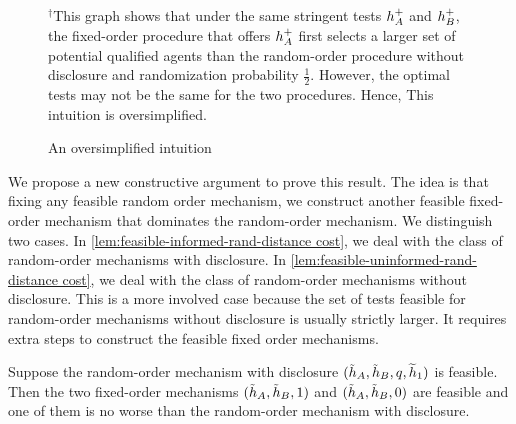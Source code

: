 \begin{figure}
\caption{An oversimplified intuition}
\label{fig: oversimplified intuition}
  \rule{0in}{1.2em}$^\dag$\scriptsize  This graph shows that under the same stringent tests $h_A^+$ and $h_B^+$, the fixed-order procedure that offers $h_A^+$ first selects a larger set of potential qualified agents than the random-order procedure without disclosure and randomization probability $\frac12$.
  However, the optimal tests may not be the same for the two procedures. Hence, This intuition is oversimplified.
\end{figure}


We propose a new constructive argument to prove this result.
The idea is that fixing any feasible random order mechanism, we construct another feasible fixed-order mechanism that dominates the random-order mechanism.
We distinguish two cases.
In \cref{lem:feasible-informed-rand-distance cost}, we deal with the class of random-order mechanisms with disclosure.
In \cref{lem:feasible-uninformed-rand-distance cost}, we deal with the class of random-order mechanisms without disclosure.
This is a more involved case because the set of tests feasible for random-order mechanisms without disclosure is usually strictly larger.
It requires extra steps to construct the feasible fixed order mechanisms.



\begin{lemma}\label{lem:feasible-informed-rand-distance cost}
 Suppose the  random-order mechanism  with disclosure $(\tilde{h}_A,\tilde{h}_B,q,\widetilde h_1)$ is feasible. 
 Then the two fixed-order mechanisms $(\tilde{h}_A,\tilde{h}_B,1)$ and $(\tilde{h}_A,\tilde{h}_B,0)$ are feasible and one of them is no worse than the  random-order mechanism with disclosure.
\end{lemma}



